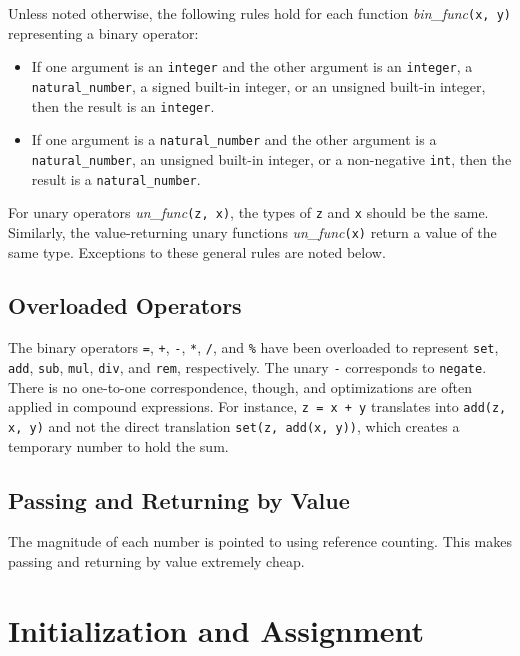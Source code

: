 \documentclass[a4paper]{article}
\begin{document}
Unless noted otherwise, the following rules hold for each function \emph{bin\_func}\texttt{(x, y)} representing a binary operator:
\begin{itemize}
\item If one argument is an \texttt{integer} and the other argument is an \texttt{integer}, a \texttt{natural\_number}, a signed built-in integer, or an unsigned built-in integer, then the result is an \texttt{integer}.
\item If one argument is a \texttt{natural\_number} and the other argument is a \texttt{natural\_number}, an unsigned built-in integer, or a non-negative \texttt{int}, then the result is a \texttt{natural\_number}.
\end{itemize}

For unary operators \emph{un\_func}\texttt{(z, x)}, the types of \texttt{z} and \texttt{x} should be the same. Similarly, the value-returning unary functions \emph{un\_func}\texttt{(x)} return a value of the same type. Exceptions to these general rules are noted below.

\subsection{Overloaded Operators}

The binary operators \texttt{=}, \texttt{+}, \texttt{-}, \texttt{*}, \texttt{/}, and \texttt{\%} have been overloaded to represent \texttt{set}, \texttt{add}, \texttt{sub}, \texttt{mul}, \texttt{div}, and \texttt{rem}, respectively. The unary \texttt{-} corresponds to \texttt{negate}. There is no one-to-one correspondence, though, and optimizations are often applied in compound expressions. For instance, \texttt{z = x + y} translates into \texttt{add(z, x, y)} and not the direct translation \texttt{set(z, add(x, y))}, which creates a temporary number to hold the sum.

\subsection{Passing and Returning by Value}

The magnitude of each number is pointed to using reference counting. This makes passing and returning by value extremely cheap.


\section{Initialization and Assignment}
\end{document}
